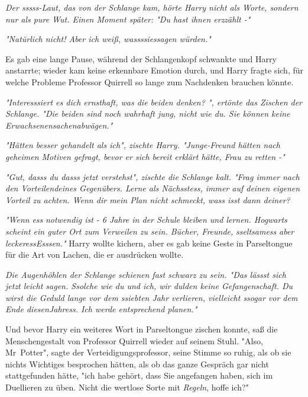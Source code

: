 {\emph{Der sssss-Laut, das von der Schlange kam, hörte Harry nicht als Worte, sondern nur als pure Wut. Einen Moment später: \emph{"Du hast ihnen} \emph{erzzählt} \emph{-"}}

\emph{\emph{"Natürlich nicht! Aber ich weiß,} \emph{wassssiessagen} \emph{würden."}}

Es gab eine lange Pause, während der Schlangenkopf schwankte und Harry anstarrte; wieder kam keine erkennbare Emotion durch, und Harry fragte sich, für welche Probleme Professor Quirrell so lange zum Nachdenken brauchen könnte.

\emph{\emph{"Interesssiert} \emph{es dich ernsthaft, was die beiden denken? "}, ertönte das Zischen der Schlange. \emph{"Die beiden} \emph{sind} \emph{noch wahrhaft jung, nicht wie} \emph{du. Sie können keine} \emph{Erwachsenensachenabwägen."}}

\emph{\emph{"Hätten besser gehandelt} \emph{als ich"}, zischte Harry. \emph{"Junge-Freund hätten nach geheimen Motiven gefragt, bevor er sich bereit erklärt hätte, Frau zu retten -"}}

\emph{\emph{"Gut,} \emph{dasss} \emph{du} \emph{dasss} \emph{jetzt verstehst}", zischte die Schlange kalt. \emph{"Frag immer nach den Vorteilendeines Gegenübers. Lerne als} \emph{Nächsstess, immer auf} \emph{deinen} \emph{eigenen Vorteil zu achten. Wenn} \emph{dir} \emph{mein Plan} \emph{nicht schmeckt,} \emph{wass} \emph{isst dann deiner?}}

\emph{"Wenn} \emph{ess} \emph{notwendig ist - 6 Jahre in der Schule bleiben und lernen. Hogwarts scheint ein guter Ort zum Verweilen zu sein. Bücher, Freunde,} \emph{sseltsamess} \emph{aber} \emph{leckeressEsssen."} Harry wollte kichern, aber es gab keine Geste in Parseltongue für die Art von Lachen, die er ausdrücken wollte.

\emph{Die Augenhöhlen der Schlange schienen fast schwarz zu sein. \emph{"Das} \emph{lässst} \emph{sich} \emph{jetzt} \emph{leicht sagen.} \emph{Ssolche} \emph{wie du und ich, wir dulden keine Gefangenschaft. Du wirst die Geduld lange vor dem} \emph{ssiebten} \emph{Jahr verlieren, vielleicht} \emph{ssogar} \emph{vor dem Ende diesenJahress. Ich werde entsprechend planen."}}

Und bevor Harry ein weiteres Wort in Parseltongue zischen konnte, saß die Menschengestalt von Professor Quirrell wieder auf seinem Stuhl. "Also, Mr~Potter", sagte der Verteidigungsprofessor, seine Stimme so ruhig, als ob sie nichts Wichtiges besprochen hätten, als ob das ganze Gespräch gar nicht stattgefunden hätte, "ich habe gehört, dass Sie angefangen haben, sich im Duellieren zu üben. Nicht die wertlose Sorte mit \emph{Regeln}, hoffe ich?"

}

